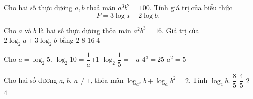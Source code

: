 \begin{bt}%
 
	Cho hai số thực dương $a, b$ thoả mãn $a^{3} b^{2}=100$. Tính giá trị của biểu thức $$P=3 \log a+2 \log b.$$
\end{bt}

\begin{ex}%
	Cho $a$  và $b$ là hai số thực dương thỏa mãn $a^2b^3=16$. Giá trị của $2\log_2a+3\log_2b$ bằng
	 \choice
		{$2$} 
		 {$8$}
		{$16$} 
		 {\True $4$}
\end{ex}

\begin{ex}%
 Cho $a=\log_2  5$.
  \choiceTF
  {$\log_2 10=\dfrac{1}{a}$+1  }
  {\True  $\log_2 \dfrac{1}{5}=-a$}
  {\True  $4^a=25$}
  {$a^2=5$} 
\end{ex}

\begin{ex}%
	Cho hai số dương $a$, $b$, $a \neq 1$, thỏa  mãn $\log _{a^2} b+\log _a b^2=2$. Tính $\log _a b$.
	\choice 
		 {$\dfrac{8}{5}$}
		 {\True $\dfrac{4}{5}$}
		 {$2$}
		 {$4$}
\end{ex}

